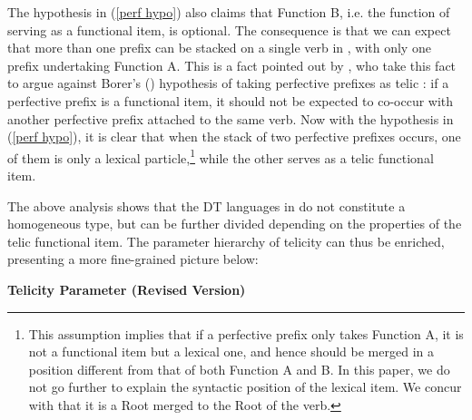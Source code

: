\documentclass[output=paper]{langsci/langscibook}
\begin{document}
The hypothesis in (\ref{perf hypo}) also claims that Function B, i.e. the
function of serving as a functional item, is optional. The consequence is that
we can expect that more than one prefix can be stacked on a single verb in
, with only one prefix undertaking Function A. This is a fact
pointed out by \textcite{filiprothstein2005}, who take this fact to argue
against Borer's (\citeyear{Borer2005b}) hypothesis of taking perfective
prefixes as telic : if a perfective prefix is a
functional item, it should not be expected to co-occur with another perfective
prefix attached to the same verb. Now with the hypothesis in (\ref{perf hypo}),
it is clear that when the stack of two perfective prefixes occurs, one of them
is only a lexical particle,\footnote{This assumption implies that if a
perfective prefix only takes Function A, it is not a functional item but a
lexical one, and hence should be merged in a position different from that of
both Function A and B. In this paper, we do not go further to explain the
syntactic position of the lexical item. We concur with
\textcite{basilico2008syntactic} that it is a Root merged to the Root of the
verb.} while the other serves as a telic functional item.

The above analysis shows that the DT languages in  do not constitute a
homogeneous type, but can be further divided depending on the properties of the
telic functional item. The parameter hierarchy of
telicity can thus be enriched, presenting a more fine-grained picture
below:\newpage

\begin{exe}
\ex \textbf{Telicity Parameter (Revised Version)}
\end{exe}
\end{document}
